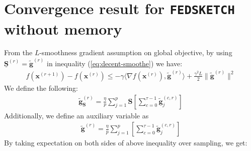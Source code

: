 \documentclass[review,onefignum,onetabnum]{siamart190516}
\begin{document}
\section{Convergence result for \texttt{FEDSKETCH} without memory}
From the $L$-smoothness gradient assumption on global objective, by using  $\underline{\mathbf{S}}^{(r)}=\tilde{\mathbf{g}}^{(r)}$ in inequality (\ref{eq:decent-smoothe}) we have:
\begin{align}
    f({\boldsymbol{x}}^{(r+1)})-f({\boldsymbol{x}}^{(r)})\leq -\gamma \big\langle\nabla f({\boldsymbol{x}}^{(r)}),\tilde{\mathbf{g}}^{(r)}\big\rangle+\frac{\gamma^2 L}{2}\|\tilde{\mathbf{g}}^{(r)}\|^2\label{eq:Lipschitz-c1}
\end{align}
We define the following:
\begin{align}
    \tilde{\mathbf{g}}_{\mathbf{S}}^{(r)}=\frac{\eta}{p}\sum_{j=1}^{p}\mathbf{S}\left[\sum_{c=0}^{\tau-1}\tilde{\mathbf{g}}_j^{(c,r)}\right]
\end{align}
Additionally, we define an auxiliary variable as 
\begin{align}
    \tilde{\mathbf{g}}^{(r)}=\frac{\eta}{p}\sum_{j=1}^{p}\left[\sum_{c=0}^{\tau-1}\tilde{\mathbf{g}}_j^{(c,r)}\right]
\end{align}
By taking expectation on both sides of above inequality over sampling, we get:
\end{document}
